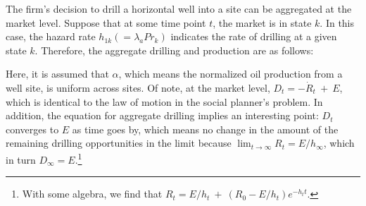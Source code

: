 %
%
%
%
%
The firm's decision to drill a horizontal well into a site can be aggregated at the market level. Suppose that at some time point $t$, the market is in state $k$. In this case, the hazard rate $h_{1k} (= \lambda_{a} Pr_{k})$ indicates the rate of drilling at a given state $k$. Therefore, the aggregate drilling and production are as follows:

Here, it is assumed that $\alpha$, which means the normalized oil production from a well site, is uniform across sites. Of note, at the market level, $D_{t} = -\dot{R}_{t} \ + \ E$, which is identical to the law of motion in the social planner's problem. In addition, the equation for aggregate drilling implies an interesting point: $D_{t}$ converges to $E$ as time goes by, which means no change in the amount of the remaining drilling opportunities in the limit because $\lim_{t \to \infty} R_{t} = E / h_{\infty}$, which in turn $D_{\infty} = E$.\footnote{With some algebra, we find that $R_{t} = E/h_{t} \ + \ (R_{0} - E/h_{t}) e^{-h_{t} t}$.}

